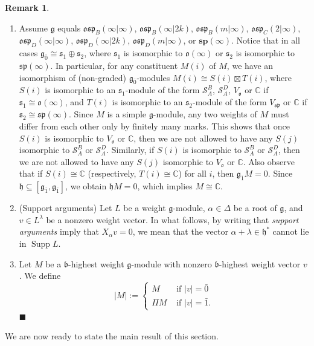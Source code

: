 \documentclass[12pt]{amsart}
\newcommand\C{\mathbb{C}}
\newcommand\g{\mathfrak{g}}
\newcommand\fs{\mathfrak{s}}
\newcommand\fh{\mathfrak{h}}
\newcommand\fb{\mathfrak{b}}
\newcommand\fsp{\mathfrak{sp}}
\newcommand\fosp{\mathfrak{osp}}
\newcommand\fo{\mathfrak{o}}
\newcommand\D{\Delta}
\newcommand\cS{\mathcal{S}}
\newcommand\bsp{\mathbf{sp}}
\DeclareMathOperator{\Supp}{Supp} %
\theoremstyle{plain}
\theoremstyle{definition}
\newtheorem{rem}[theo]{Remark}
\numberwithin{equation}{section}
\newcommand\xqed[1]{%
  \leavevmode\unskip\penalty9999 \hbox{}\nobreak\hfill
  \quad\hbox{#1}}
\newcommand\demo{\xqed{$\blacksquare$}}
\begin{document}
\begin{rem}\label{rem:supp.arguments}
\begin{enumerate}
\item Assume $\g$ equals $\fosp_B(\infty|\infty)$, $\fosp_B(\infty|2k)$, $\fosp_B(m|\infty)$, $\fosp_C(2|\infty)$, $\fosp_D(\infty|\infty)$, $\fosp_D(\infty|2k)$, $\fosp_D(m|\infty)$, or $\bsp(\infty)$. Notice that in all cases $\g_{\bar 0}\cong \fs_1\oplus \fs_2$, where $\fs_1$ is isomorphic to $\fo(\infty)$ or $\fs_2$ is isomorphic to $\fsp(\infty)$. In particular, for any constituent $M(i)$ of $M$, we have an isomorphism of (non-graded) $\g_{\bar 0}$-modules $M(i)\cong S(i)\boxtimes T(i)$, where $S(i)$ is isomorphic to an $\fs_1$-module of the form $\cS_A^B$, $\cS_A^D$, $V_\fo$ or $\C$ if $\fs_1\cong \fo(\infty)$, and $T(i)$ is isomorphic to an $\fs_2$-module of the form $V_\fsp$ or $\C$ if $\fs_2\cong \fsp(\infty)$. Since $M$ is a simple $\g$-module, any two weights of $M$ must differ from each other only by finitely many marks. This shows that once $S(i)$ is isomorphic to $V_\fo$ or $\C$, then we are not allowed to have any $S(j)$ isomorphic to $\cS_A^B$ or $\cS_A^D$. Similarly, if $S(i)$ is isomorphic to $\cS_A^B$ or $\cS_A^D$, then we are not allowed to have any $S(j)$ isomorphic to $V_\fo$ or $\C$. Also observe that if $S(i)\cong \C$ (respectively, $T(i)\cong \C$) for all $i$, then $\g_{\bar 1}M=0$. Since $\fh\subseteq [\g_{\bar 1}, \g_{\bar 1}]$, we obtain $\fh M=0$, which implies $M\cong \C$.
\item (Support arguments) Let $L$ be a weight $\g$-module, $\alpha\in \D$ be a root of $\g$, and $v\in L^\lambda$ be a nonzero weight vector. In what follows, by writing that \emph{support arguments} imply that $X_\alpha v = 0$, we mean that the vector $\alpha + \lambda\in \fh^*$ cannot lie in $\Supp L$.
\item Let $M$ be a $\fb$-highest weight $\g$-module with nonzero $\fb$-highest weight vector $v$. We define
	\[ 
|M| := \begin{cases} 
	M & \text{ if } |v| = {\bar 0} \\
	\Pi M  & \text{ if } |v|={\bar 1}.
  \end{cases}
	\]
\demo
\end{enumerate}
\end{rem}

We are now ready to state the main result of this section.
\end{document}
